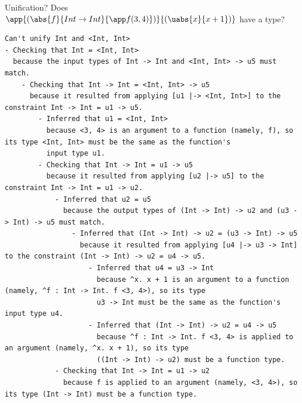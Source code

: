 \documentclass[xcolor=svgnames,12pt,aspectratio=169]{beamer}
\newenvironment{xframe}[1][]
  {\begin{frame}[fragile,environment=xframe,#1]}
  {\end{frame}}
\begin{document}
\begin{xframe}{Unification?}
  \small Does $\app{(\abs{f}{Int \to Int}{\app f
      {(3,4)}})}{(\uabs{x}{x+1})}$ have a type?

  \tiny
  \begin{Verbatim}
Can't unify Int and <Int, Int>
- Checking that Int = <Int, Int>
  because the input types of Int -> Int and <Int, Int> -> u5 must match.
    - Checking that Int -> Int = <Int, Int> -> u5
      because it resulted from applying [u1 |-> <Int, Int>] to the constraint Int -> Int = u1 -> u5.
        - Inferred that u1 = <Int, Int>
          because <3, 4> is an argument to a function (namely, f), so its type <Int, Int> must be the same as the function's
          input type u1.
        - Checking that Int -> Int = u1 -> u5
          because it resulted from applying [u2 |-> u5] to the constraint Int -> Int = u1 -> u2.
            - Inferred that u2 = u5
              because the output types of (Int -> Int) -> u2 and (u3 -> Int) -> u5 must match.
                - Inferred that (Int -> Int) -> u2 = (u3 -> Int) -> u5
                  because it resulted from applying [u4 |-> u3 -> Int] to the constraint (Int -> Int) -> u2 = u4 -> u5.
                    - Inferred that u4 = u3 -> Int
                      because ^x. x + 1 is an argument to a function (namely, ^f : Int -> Int. f <3, 4>), so its type
                      u3 -> Int must be the same as the function's input type u4.
                    - Inferred that (Int -> Int) -> u2 = u4 -> u5
                      because ^f : Int -> Int. f <3, 4> is applied to an argument (namely, ^x. x + 1), so its type
                      ((Int -> Int) -> u2) must be a function type.
            - Checking that Int -> Int = u1 -> u2
              because f is applied to an argument (namely, <3, 4>), so its type (Int -> Int) must be a function type.
  \end{Verbatim}
\end{xframe}
\end{document}
